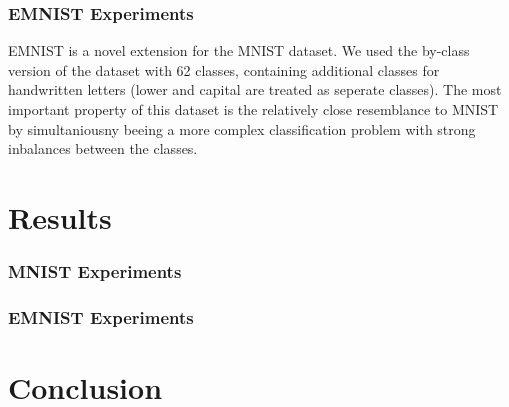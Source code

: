 \documentclass[a4paper,pt12]{article}
\begin{document}
\subsubsection{EMNIST Experiments}
EMNIST is a novel extension for the MNIST dataset. We used the by-class version of the dataset with 62 classes, containing additional classes for handwritten letters (lower and capital are treated as seperate classes). The most important property of this dataset is the relatively close resemblance to MNIST by simultaniousny beeing a more complex classification problem with strong inbalances between the classes.

\section{Results}

\subsubsection{MNIST Experiments}

\subsubsection{EMNIST Experiments}

\section{Conclusion}


%
%


\nocite{*}

\end{document}
